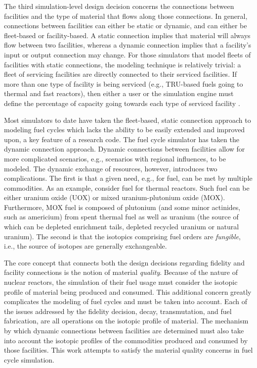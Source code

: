 The third simulation-level design decision concerns the connections between
facilities and the type of material that flows along those connections. In
general, connections between facilities can either be static or dynamic, and can
either be fleet-based or facility-based. A static connection implies that
material will always flow between two facilities, whereas a dynamic connection
implies that a facility's input or output connection may change.  For those
simulators that model fleets of facilities with static connections, the modeling
technique is relatively trivial: a fleet of servicing facilities are directly
connected to their serviced facilities. If more than one type of facility is
being serviced (e.g., TRU-based fuels going to thermal and fast reactors), then
either a user or the simulation engine must define the percentage of capacity
going towards each type of serviced facility \cite{busquim_e_silva_system_2008}.

Most simulators to date have taken the fleet-based, static connection approach
to modeling fuel cycles which lacks the ability to be easily extended and
improved upon, a key feature of a research code. The \Cyclus fuel cycle
simulator has taken the dynamic connection approach. Dynamic connections between
facilities allow for more complicated scenarios, e.g., scenarios with regional
influences, to be modeled. The dynamic exchange of resources, however,
introduces two complications. The first is that a given need, e.g., for fuel,
can be met by multiple commodities. As an example, consider fuel for thermal
reactors. Such fuel can be either uranium oxide (UOX) or mixed uranium-plutonium
oxide (MOX). Furthermore, MOX fuel is composed of plutonium (and some minor
actinides, such as americium) from spent thermal fuel as well as uranium (the
source of which can be depleted enrichment tails, depleted recycled uranium or
natural uranium). The second is that the isotopics comprising fuel orders
are \textit{fungible}, i.e., the source of isotopes are generally exchangeable. 

The core concept that connects both the design decisions regarding fidelity and
facility connections is the notion of material \textit{quality}. Because of the
nature of nuclear reactors, the simulation of their fuel usage must consider the
isotopic profile of material being produced and consumed. This additional
concern greatly complicates the modeling of fuel cycles and must be taken into
account. Each of the issues addressed by the fidelity decision, decay,
transmutation, and fuel fabrication, are all operations on the isotopic profile
of material. The mechanism by which dynamic connections between facilities are
determined must also take into account the isotopic profiles of the commodities
produced and consumed by those facilities. This work attempts to satisfy the
material quality concerns in fuel cycle simulation.
